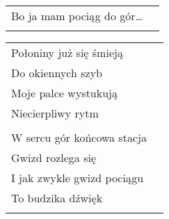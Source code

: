 \documentclass[a5paper]{article}
\begin{document}
\noindent
\begin{tabular}{@{}p{7.50cm}p{3cm}@{}}
Bo ja mam pociąg do gór… \\ \\
\end{tabular}

\noindent
\begin{tabular}{@{}p{7.50cm}p{3cm}@{}}
Połoniny już się śmieją \\
Do okiennych szyb \\
Moje palce wystukują \\
Niecierpliwy rytm \\ \\

W sercu gór końcowa stacja \\
Gwizd rozlega się \\
I jak zwykle gwizd pociągu \\
To budzika dźwięk \\ \\
\end{tabular}
\end{document}
